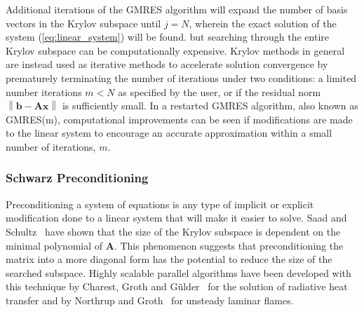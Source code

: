 \documentclass[titlepage,11pt,letterpaper]{article}
\begin{document}
Additional iterations of the GMRES algorithm will expand the number of basis vectors in the 
Krylov subspace until $j=N$, wherein the exact solution of the system 
(\ref{eq:linear_system}) will be found. but searching through the entire Krylov subspace can 
be computationally expensive. Krylov methods in general are instead used as iterative 
methods to accelerate solution convergence by prematurely terminating the number of 
iterations under two conditions: a limited number iterations $m<N$ as specified by the user, 
or if the residual norm $\left\|\mathbf {b-Ax}\right\|$ is sufficiently small. In a 
restarted GMRES algorithm, also known as GMRES(m), computational improvements can be seen if 
modifications are made to the linear system to encourage an accurate approximation within a 
small number of iterations, $m$.

\subsubsection{Schwarz Preconditioning}
Preconditioning a system of equations is any type of implicit or explicit modification done 
to a linear system that will make it easier to solve. Saad and Schultz~\cite{saad:1986} have 
shown that the size of the Krylov subspace is dependent on the minimal polynomial of 
$\mathbf A$. This phenomenon suggests that preconditioning the matrix into a more diagonal 
form has the potential to reduce the size of the searched subspace. Highly scalable parallel 
algorithms have been developed with this technique by Charest, Groth and 
G\"{u}lder~\cite{charest:2008} for the solution of radiative heat transfer and by Northrup 
and Groth~\cite{northrup:2009a} for unsteady laminar flames.
\end{document}
